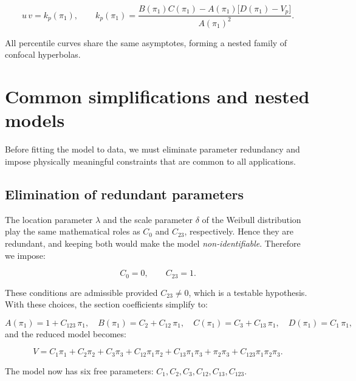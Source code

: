 \begin{equation}\label{eq:canonical_percentile}
\boxed{
u\,v = k_p(\pi_1),\qquad
k_p(\pi_1) = \frac{B(\pi_1)C(\pi_1)-A(\pi_1)\bigl[D(\pi_1)-V_p\bigr]}{A(\pi_1)^2}.
}
\end{equation}

All percentile curves share the same asymptotes, forming a nested family of confocal hyperbolas.

\section{Common simplifications and nested models}
\label{sec:simplifications}

Before fitting the model to data, we must eliminate parameter redundancy and impose physically meaningful constraints that are common to all applications.

\subsection{Elimination of redundant parameters}

The location parameter \(\lambda\) and the scale parameter \(\delta\) of the Weibull distribution play the same mathematical roles as \(C_0\) and \(C_{23}\), respectively. Hence they are redundant, and keeping both would make the model \emph{non‑identifiable}. Therefore we impose:

\begin{equation}\label{eq:reduction_conditions}
\boxed{C_0 = 0,\qquad C_{23} = 1.}
\end{equation}

These conditions are admissible provided \(C_{23} \neq 0\), which is a testable hypothesis. With these choices, the section coefficients simplify to:

\begin{equation}\label{eq:ABCD_reduced}
A(\pi_1) = 1 + C_{123}\,\pi_1,\quad
B(\pi_1) = C_2 + C_{12}\,\pi_1,\quad
C(\pi_1) = C_3 + C_{13}\,\pi_1,\quad
D(\pi_1) = C_1\,\pi_1,
\end{equation}
and the reduced model becomes:

\begin{equation}\label{eq:reduced_model}
\boxed{
V = C_1\pi_1
    + C_2\pi_2
    + C_3\pi_3
    + C_{12}\pi_1\pi_2
    + C_{13}\pi_1\pi_3
    + \pi_2\pi_3
    + C_{123}\pi_1\pi_2\pi_3.
}
\end{equation}

The model now has six free parameters: \(C_1, C_2, C_3, C_{12}, C_{13}, C_{123}\).

